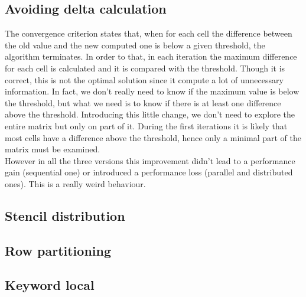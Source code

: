 \documentclass{article}
\begin{document}
\subsection{Avoiding delta calculation}
The convergence criterion states that, when for each cell the difference between the old value and the new computed one is below a given threshold, the algorithm terminates. In order to that, in each iteration the maximum difference for each cell is calculated and it is compared with the threshold. Though it is correct, this is not the optimal solution since it compute a lot of unnecessary information. In fact, we don't really need to know if the maximum value is below the threshold, but what we need is to know if there is at least one difference above the threshold. Introducing this little change, we don't need to explore the entire matrix but only on part of it. During the first iterations it is likely that most cells have a difference above the threshold, hence only a minimal part of the matrix must be examined. \\
However in all the three versions this improvement didn't lead to a performance gain (sequential one) or introduced a performance loss (parallel and distributed ones). This is a really weird behaviour.

\subsection{Stencil distribution}

\subsection{Row partitioning}

\subsection{Keyword local}
\end{document}
